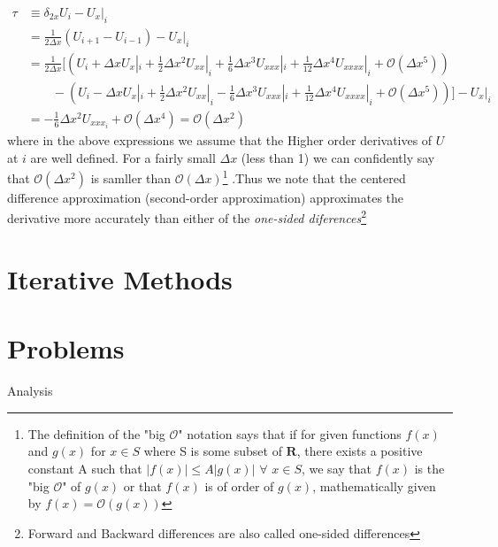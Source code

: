 \documentclass[11pt]{report}
\numberwithin{equation}{section}
\newcommand{\mcm}[1]{\mathcal{#1}}
\newcommand{\bo}{\mcm{O}}
\begin{document}
\begin{align*}
    \tau &\equiv \delta _ {2x} U_ i - {U_ x}|_ i \\
    &= \frac{1}{{2 \scriptstyle \Delta } x}\left( U_ {i+1} - U_{i-1}\right) - {U_ x}|_i \\
    &= \frac{1}{{2 \scriptstyle \Delta } x}[ \left( U_ i + {\scriptstyle \Delta } x{U_ x}|_ i + \frac{1}{2}{\scriptstyle \Delta } x^2{U_{xx}}|_ i + \frac{1}{6}{\scriptstyle \Delta } x^3{U_{xxx}}|_ i + \frac{1}{12}{\scriptstyle \Delta } x^4{U_{xxxx}}|_ i + \mcm{O}({\scriptstyle \Delta } x^5)\right) \\
    &\qquad - \left( U_ i - {\scriptstyle \Delta } x{U_ x}|_ i + \frac{1}{2}{\scriptstyle \Delta } x^2{U_{xx}}|_ i - \frac{1}{6}{\scriptstyle \Delta } x^3{U_{xxx}}|_ i + \frac{1}{12}{\scriptstyle \Delta } x^4{U_{xxxx}}|_ i +\mcm{O}({\scriptstyle \Delta } x^5)\right)] - {U_ x}|_ i \\
    &= -\frac{1}{6}\Delta x^2 U_{xxx_ i} + \mcm{O}(\Delta x^4) = \mcm{O}(\Delta x^2)
\end{align*}
where in the above expressions we assume that the Higher order derivatives of $U$ at $i$ are well defined. For a fairly small $\Delta x$ (less than 1) we can confidently say that $\bo(\Delta x^2)$ is samller than $\bo(\Delta x)$\footnote{The definition of the "big $\bo$" notation says that if for given functions $f(x)$ and $g(x)$ for $x \in S$ where S is some subset of $\mathbf{R}$, there exists a positive constant A such that $|f(x)| \leq A|g(x)|$ $\forall$ $x \in S$, we say that $f(x)$ is the "big $\bo$" of $g(x)$ or that $f(x)$ is of order of $g(x)$, mathematically given by $f(x) = \bo(g(x))$} .Thus we note that the centered difference approximation (second-order approximation) approximates the derivative more accurately than either of the \textit{one-sided diferences}\footnote{Forward and Backward differences are also called one-sided differences}

\section{Iterative Methods}


\section{Problems}
Analysis  
\end{document}
